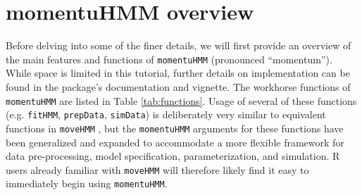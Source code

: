 \documentclass[12pt]{article}\usepackage[]{graphicx}\usepackage[]{xcolor}
\begin{document}
\section{momentuHMM overview}
Before delving into some of the finer details, we will first provide an overview of the main features and functions of \verb|momentuHMM| (pronounced ``momentum''). While space is limited in this tutorial, further details on implementation can be found in the package's documentation and vignette. The workhorse functions of \verb|momentuHMM| are listed in Table \ref{tab:functions}. Usage of several of these functions (e.g. \verb|fitHMM|, \verb|prepData|, \verb|simData|) is deliberately very similar to equivalent functions in \verb|moveHMM| \citep{MichelotEtAl2016} , but the \verb|momentuHMM| arguments for these functions have been generalized and expanded to accommodate a more flexible framework for data pre-processing, model specification, parameterization, and simulation. R users already familiar with \verb|moveHMM| will therefore likely find it easy to immediately begin using \verb|momentuHMM|. %
\end{document}
